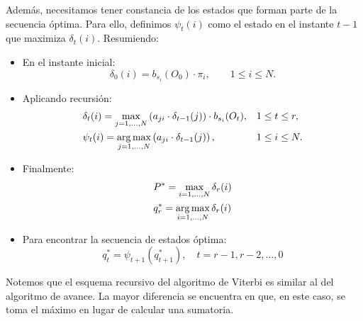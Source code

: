Además, necesitamos tener constancia de los estados que forman parte de la secuencia óptima. Para ello, definimos $\psi_t(i)$ como el estado en el instante $t-1$ que maximiza $\delta_t(i)$. Resumiendo:
\begin{itemize}
    \item En el instante inicial:
    \begin{equation*}
        \delta_0(i)=b_{s_i}(O_0)\cdot\pi_i, \qquad 1\leq i\leq N.
    \end{equation*}
    \item Aplicando recursión:
    \begin{align*}
        &\delta_t(i)=\max_{j=1,\dots,N}\left(a_{ji}\cdot\delta_{t-1}(j)\right) \cdot b_{s_i}(O_t), && 1\leq t\leq r, \\
        &\psi_t(i)=\operatorname*{\arg\max}_{j=1,\dots,N}\left(a_{ji}\cdot\delta_{t-1}(j)\right),  &&  1\leq i\leq N.
    \end{align*}
    \item Finalmente:
    \begin{align*}
        & P^* = \max_{i=1,\dots,N} \delta_r(i)\\
        & q_r^*=\operatorname*{\arg\max}_{i=1,\dots,N} \delta_r(i)
    \end{align*} 
    \item Para encontrar la secuencia de estados óptima:
    \[q_t^*=\psi_{t+1}(q_{t+1}^*), \quad t=r-1,r-2,\dots,0\]
\end{itemize}
Notemos que el esquema recursivo del algoritmo de Viterbi es similar al del algoritmo de avance. La mayor diferencia se encuentra en que, en este caso, se toma el máximo en lugar de calcular una sumatoria.

